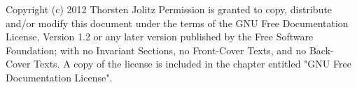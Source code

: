 \begin{titlepage}
\end{titlepage}

\newpage



\text{}
\vspace{13.5cm}

\begin{wideverbatim}
  Copyright (c)  2012  Thorsten Jolitz
  Permission is granted to copy, distribute and/or modify this document
  under the terms of the GNU Free Documentation License, Version 1.2
  or any later version published by the Free Software Foundation;
  with no Invariant Sections, no Front-Cover Texts, and no Back-Cover
  Texts.  A copy of the license is included in the chapter entitled "GNU
  Free Documentation License".
\end{wideverbatim}


